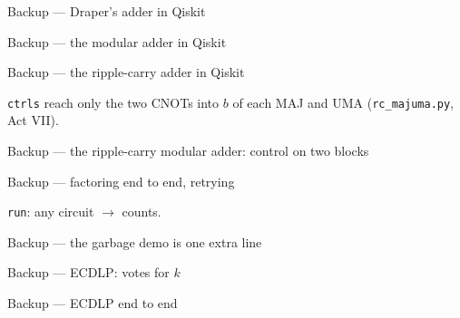 \documentclass[aspectratio=169,11pt]{beamer}
\newcommand{\code}[2][]{}
\begin{document}
\begin{frame}[fragile]{Backup --- Draper's adder in Qiskit}
  \code[basicstyle=\ttfamily\scriptsize]{add_const.py}
\end{frame}

\begin{frame}[fragile]{Backup --- the modular adder in Qiskit}
  \code[basicstyle=\ttfamily\scriptsize]{c_add_mod.py}
\end{frame}

\begin{frame}[fragile]{Backup --- the ripple-carry adder in Qiskit}
  \code[basicstyle=\ttfamily\footnotesize]{rc_add.py}
  \vskip2mm
  {\small \texttt{ctrls} reach only the two CNOTs into $b$ of each MAJ and UMA (\texttt{rc\_majuma.py}, Act VII).}
\end{frame}

\begin{frame}[fragile]{Backup --- the ripple-carry modular adder: control on two blocks}
  \code[basicstyle=\ttfamily\fontsize{7.2}{8.3}\selectfont]{rc_c_add_mod.py}
\end{frame}

\begin{frame}[fragile]{Backup --- factoring end to end, retrying}
  \code[basicstyle=\ttfamily\footnotesize]{find_factor.py}
  \vskip2mm
  \texttt{run}: any circuit $\to$ counts.
\end{frame}

\begin{frame}[fragile]{Backup --- the garbage demo is one extra line}
  \code[basicstyle=\ttfamily\footnotesize]{garbage.py}
\end{frame}

\begin{frame}[fragile]{Backup --- ECDLP: votes for $k$}
  \code[basicstyle=\ttfamily\footnotesize]{ecdlp_post.py}
\end{frame}

\begin{frame}[fragile]{Backup --- ECDLP end to end}
  \code[basicstyle=\ttfamily\footnotesize]{ecdlp_run.py}
\end{frame}
\end{document}
